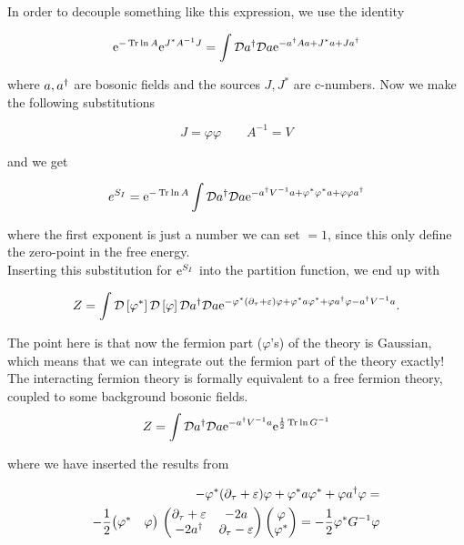 In order to decouple something like this expression, we use the identity

\begin{align*}
    \mathrm{e}^{-\Tr \ln A}\mathrm{e}^{J^*A^{-1}J} = \int \mathcal{D} a^{\dagger} \mathcal{D} a \mathrm{e}^{-a^{\dagger}Aa + J^*a + Ja^{\dagger}}
\end{align*}

where $a,a^{\dagger}$ are bosonic fields and the sources $J, J^*$ are c-numbers. Now we make the following substitutions 

\begin{equation*}
    J = \varphi \varphi \quad \quad  A^{-1} = V
\end{equation*}

and we get

\begin{equation*}
    e^{S_I}  = \mathrm{e}^{-\Tr \ln A} \int \mathcal{D} a^{\dagger} \mathcal{D} a \mathrm{e}^{-a^{\dagger}V^{-1}a + \varphi^* \varphi^*a + \varphi \varphi a^{\dagger}}
\end{equation*}

where the first exponent is just a number we can set $=1$, since this only define the zero-point in the free energy. \\ 

Inserting this substitution for $\mathrm{e}^{S_I}$ into the partition function, we end up with 

\begin{equation*}
    Z = \int \mathcal{D} \left[ \varphi^*\right] \mathcal{D} \left[\varphi\right]\mathcal{D} a^{\dagger} \mathcal{D} a \mathrm{e}^{-\varphi^*(\partial_\tau + \varepsilon)\varphi + \varphi^*a\varphi^* + \varphi a^{\dagger} \varphi - a^{\dagger} V^{-1}a}. 
\end{equation*}

The point here is that now the fermion part ($\varphi$'s) of the theory is Gaussian, which means that we can integrate out the fermion part of the theory exactly! The interacting fermion theory is formally equivalent to a free fermion theory, coupled to some background bosonic fields. \\ 

\begin{equation}
    Z = \int \mathcal{D} a^{\dagger} \mathcal{D} a \mathrm{e}^{-a^{\dagger} V^{-1} a} \mathrm{e}^{\frac{1}{2}\Tr \ln G^{-1}}
\end{equation}

where we have inserted the results from 

\begin{align*}
    -\varphi^*(\partial_\tau + \varepsilon)\varphi + \varphi^*a\varphi^* + \varphi a^{\dagger} \varphi = \\  -\frac{1}{2}\begin{matrix}\begin{pmatrix}\varphi^* & \varphi\end{pmatrix}\mbox{}\end{matrix}
  \begin{pmatrix} \partial_\tau + \varepsilon & -2a \\ -2a^{\dagger} & \partial_\tau - \varepsilon \end{pmatrix} 
  \begin{pmatrix} \varphi \\ \varphi^* \end{pmatrix} = -\frac{1}{2}\varphi^* G^{-1}\varphi
\end{align*}

